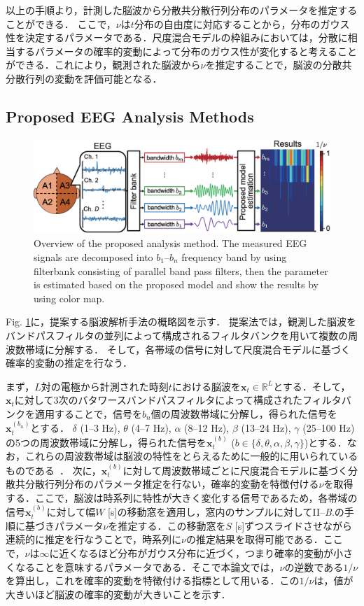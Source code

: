 \documentclass[journal]{IEEEtran}
\begin{document}
以上の手順より，計測した脳波から分散共分散行列分布のパラメータを推定することができる．
ここで，$\nu$は$t$分布の自由度に対応することから，分布のガウス性を決定するパラメータである．尺度混合モデルの枠組みにおいては，分散に相当するパラメータの確率的変動によって分布のガウス性が変化すると考えることができる．これにより，観測された脳波から$\nu$を推定することで，脳波の分散共分散行列の変動を評価可能となる．

\subsection{Proposed EEG Analysis Methods}
\begin{figure}[!ht]
\centering
\includegraphics[width=0.95\hsize]{figure/system_3.eps}
\caption{Overview of the proposed analysis method. The measured EEG signals are decomposed into $b_1$--$b_n$ frequency band by using filterbank consisting of parallel band pass filters, then the parameter is estimated based on the proposed model and show the results by using color map.}
\label{fig:system}
\end{figure}
Fig. \ref{fig:system}に，提案する脳波解析手法の概略図を示す．
提案法では，観測した脳波をバンドパスフィルタの並列によって構成されるフィルタバンクを用いて複数の周波数帯域に分解する．
そして，各帯域の信号に対して尺度混合モデルに基づく確率的変動の推定を行なう．

まず，$L$対の電極から計測された時刻$t$における脳波を$\mathbf{x}_t \in \mathbb{R}^L$とする．そして，$\mathbf{x}_t$に対して3次のバタワースバンドパスフィルタによって構成されたフィルタバンクを適用することで，信号を$b_n$個の周波数帯域に分解し，得られた信号を$\mathbf{x}^{(b_n)}_t$とする．
$\delta$ (1--3 Hz), $\theta$ (4--7 Hz), $\alpha$ (8--12 Hz), $\beta$ (13--24 Hz), $\gamma$ (25--100 Hz) の5つの周波数帯域に分解し，得られた信号を$\mathbf{x}^{(b)}_t$ ($b \in\{\delta, \theta, \alpha,\beta, \gamma\}$)とする．なお，これらの周波数帯域は脳波の特性をとらえるために一般的に用いられているものである~\cite{ep1994}．
次に，$\mathbf{x}^{(b)}_t$に対して周波数帯域ごとに尺度混合モデルに基づく分散共分散行列分布のパラメータ推定を行ない，確率的変動を特徴付ける$\nu$を取得する．ここで，脳波は時系列に特性が大きく変化する信号であるため，各帯域の信号$\mathbf{x}^{(b)}_t$に対して幅$W$ [s]の移動窓を適用し，窓内のサンプルに対してII--\textit{B}.の手順に基づきパラメータ$\nu$を推定する．この移動窓を$S$ [s]ずつスライドさせながら連続的に推定を行なうことで，時系列に$\nu$の推定結果を取得可能である．ここで，$\nu$は$\infty$に近くなるほど分布がガウス分布に近づく，つまり確率的変動が小さくなることを意味するパラメータである．そこで本論文では，$\nu$の逆数である$1/\nu$を算出し，これを確率的変動を特徴付ける指標として用いる．この$1/\nu$は，値が大きいほど脳波の確率的変動が大きいことを示す．
\end{document}
